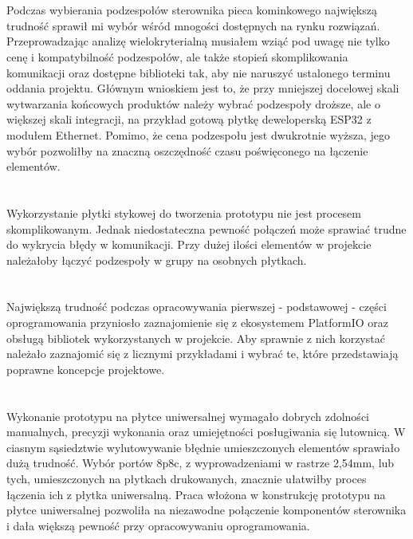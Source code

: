 \documentclass[11pt]{report}
\begin{document}
\section{}
Podczas wybierania podzespołów sterownika pieca kominkowego największą trudność sprawił mi wybór wśród mnogości dostępnych na rynku rozwiązań. Przeprowadzając analizę wielokryterialną musiałem wziąć pod uwagę nie tylko cenę i kompatybilność podzespołów, ale także stopień skomplikowania komunikacji oraz dostępne biblioteki tak, aby nie naruszyć ustalonego terminu oddania projektu.
Głównym wnioskiem jest to, że przy mniejszej docelowej skali wytwarzania końcowych produktów należy wybrać podzespoły droższe, ale o większej skali integracji, na przykład gotową płytkę deweloperską ESP32 z modułem Ethernet. Pomimo, że cena podzespołu jest dwukrotnie wyższa, jego wybór pozwoliłby na znaczną oszczędność czasu poświęconego na łączenie elementów.
\section{}
Wykorzystanie płytki stykowej do tworzenia prototypu nie jest procesem skomplikowanym. Jednak niedostateczna pewność połączeń może sprawiać trudne do wykrycia błędy w komunikacji.
Przy dużej ilości elementów w projekcie należałoby łączyć podzespoły w grupy na osobnych płytkach.
\section{}
Największą trudność podczas opracowywania pierwszej - podstawowej - części oprogramowania przyniosło zaznajomienie się z ekosystemem PlatformIO oraz obsługą bibliotek wykorzystanych w projekcie. Aby sprawnie z nich korzystać należało zaznajomić się z licznymi przykładami i wybrać te, które przedstawiają poprawne koncepcje projektowe.
\section{}
Wykonanie prototypu na płytce uniwersalnej wymagało dobrych zdolności manualnych, precyzji wykonania oraz umiejętności posługiwania się lutownicą. W ciasnym sąsiedztwie wylutowywanie błędnie umieszczonych elementów sprawiało dużą trudność.
Wybór portów 8p8c, z wyprowadzeniami w rastrze 2,54mm, lub tych, umieszczonych na płytkach drukowanych, znacznie ułatwiłby proces łączenia ich z płytka uniwersalną.
Praca włożona w konstrukcję prototypu na płytce uniwersalnej pozwoliła na niezawodne połączenie komponentów sterownika i dała większą pewność przy opracowywaniu oprogramowania.
\end{document}

